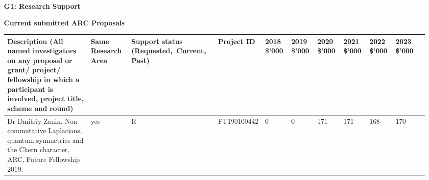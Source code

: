 \documentclass[12pt,reqno]{amsart}
\begin{document}
{\bf G1: Research Support}

\medskip
{\bf Current submitted ARC Proposals}

\begin{tabular}{|p{26mm}|p{17mm}|p{18mm}|p{23mm}|p{10mm}|p{10mm}|p{10mm}|p{10mm}|p{10mm}|p{10mm}|p{10mm}|}
\hline
{\bf Description} {(All named
investigators on any
proposal or grant/
project/ fellowship in
which a participant is
involved, project title,
scheme and round) } & {\bf Same Research Area} &{\bf Support status} ({\mbox\!Requested,\  Current, Past}) & {\bf 
Project ID} & {\bf 2018} \$'000 & {\bf 2019} \$'000 & {\bf 2020} \$'000 & {\bf 2021} \$'000 & {\bf 2022} \$'000& {\bf 2023} \$'000 \\
\hline
Dr Dmitriy Zanin, Non-commutative Laplacians, quantum symmetries and the Chern character, ARC, Future Fellowship 2019.
& yes & R & FT190100442 &0& 0 & 171 & 171& 168 & 170 \\


\hline
\end{tabular}


%
%
%
\end{document}
